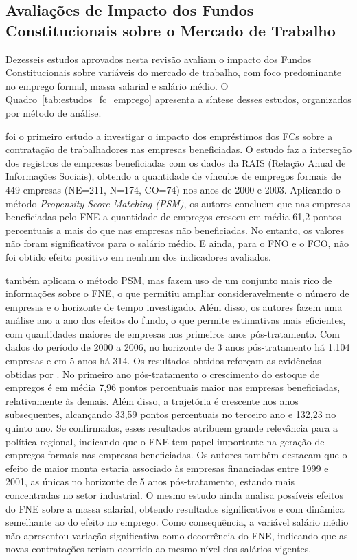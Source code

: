 \subsection{Avaliações de Impacto dos Fundos Constitucionais sobre o Mercado de Trabalho}

Dezesseis estudos aprovados nesta revisão avaliam o impacto dos Fundos Constitucionais sobre variáveis do mercado de trabalho, com foco predominante no emprego formal, massa salarial e salário médio. O Quadro~\ref{tab:estudos_fc_emprego} apresenta a síntese desses estudos, organizados por método de análise.



 foi o primeiro estudo a investigar o impacto dos empréstimos dos FCs sobre a contratação de trabalhadores nas empresas beneficiadas. O estudo faz a interseção dos registros de empresas beneficiadas com os dados da RAIS (Relação Anual de Informações Sociais), obtendo a quantidade de vínculos de empregos formais de 449 empresas (NE=211, N=174, CO=74) nos anos de 2000 e 2003. Aplicando o método \textit{Propensity Score Matching (PSM)}, os autores concluem que nas empresas beneficiadas pelo FNE a quantidade de empregos cresceu em média 61,2 pontos percentuais a mais do que nas empresas não beneficiadas. No entanto, os valores não foram significativos para o salário médio. E ainda, para o FNO e o FCO, não foi obtido efeito positivo em nenhum dos indicadores avaliados.

 também aplicam o método PSM, mas fazem uso de um conjunto mais rico de informações sobre o FNE, o que permitiu ampliar consideravelmente o número de empresas e o horizonte de tempo investigado. Além disso, os autores fazem uma análise ano a ano dos efeitos do fundo, o que permite estimativas mais eficientes, com quantidades maiores de empresas nos primeiros anos pós-tratamento. Com dados do período de 2000 a 2006, no horizonte de 3 anos pós-tratamento há 1.104 empresas e em 5 anos há 314. Os resultados obtidos reforçam as evidências obtidas por . No primeiro ano pós-tratamento o crescimento do estoque de empregos é em média 7,96 pontos percentuais maior nas empresas beneficiadas, relativamente às demais. Além disso, a trajetória é crescente nos anos subsequentes, alcançando 33,59 pontos percentuais no terceiro ano e 132,23 no quinto ano. Se confirmados, esses resultados atribuem grande relevância para a política regional, indicando que o FNE tem papel importante na geração de empregos formais nas empresas beneficiadas. Os autores também destacam que o efeito de maior monta estaria associado às empresas financiadas entre 1999 e 2001, as únicas no horizonte de 5 anos pós-tratamento, estando mais concentradas no setor industrial. O mesmo estudo ainda analisa possíveis efeitos do FNE sobre a massa salarial, obtendo resultados significativos e com dinâmica semelhante ao do efeito no emprego. Como consequência, a variável salário médio não apresentou variação significativa como decorrência do FNE, indicando que as novas contratações teriam ocorrido ao mesmo nível dos salários vigentes.

